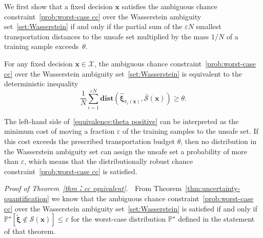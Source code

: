 \documentclass[nonblindrev]{informs2017}
\newcommand{\bmt}[1]{\tilde{\bm{#1}}}
\newcommand{\bmh}[1]{\hat{\bm{#1}}}
\newcommand{\1}[1]{\mathds{1}{\left(#1\right)}}
\begin{document}
We first show that a fixed decision $\bm{x}$ satisfies the ambiguous chance constraint~\eqref{prob:worst-case cc} over the Wasserstein ambiguity set~\eqref{set:Wasserstein} if and only if the partial sum of the $\varepsilon N$ smallest transportation distances to the unsafe set multiplied by the mass $1/N$ of a training sample exceeds~$\theta$.

\begin{theorem}\label{thm：cc equivalent}
For any fixed decision $\bm{x}\in \mathcal{X}$, the ambiguous chance constraint~\eqref{prob:worst-case cc} over the Wasserstein ambiguity set~\eqref{set:Wasserstein} is equivalent to the deterministic inequality
\begin{equation}
\label{equivalence:theta positive}
\dfrac{1}{N}\sum_{i = 1}^{\varepsilon N} \mathbf{dist}(\bmh{\xi}_{\pi_i(\bm{x})}, \bar{\mathcal{S}}(\bm{x})) \ge \theta.
\end{equation}
\end{theorem} 

The left-hand side of~\eqref{equivalence:theta positive} can be interpreted as the minimum cost of moving a fraction $\varepsilon$ of the training samples to the unsafe set. If this cost exceeds the prescribed transportation budget $\theta$, then no distribution in the Wasserstein ambiguity set can assign the unsafe set a probability of more than $\varepsilon$, which means that the distributionally robust chance constraint~\eqref{prob:worst-case cc} is satisfied.

\noindent \emph{Proof of Theorem~\ref{thm：cc equivalent}.} $\;$
From Theorem~\ref{thm:uncertainty-quantification} we know that the ambiguous chance constraint~\eqref{prob:worst-case cc} over the Wasserstein ambiguity set~\eqref{set:Wasserstein} is satisfied if and only if $\mathbb{P}^\star [\bmt{\xi} \notin \mathcal{S}(\bm{x})] \leq \varepsilon$ for the worst-case distribution $\mathbb{P}^\star$ defined in the statement of that theorem.
\end{document}
